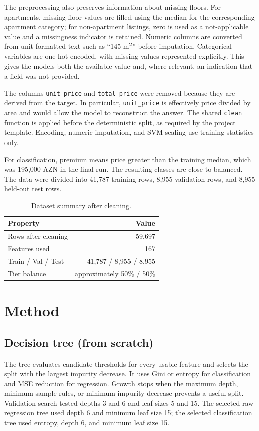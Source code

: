 \documentclass[10pt,twocolumn,a4paper]{article}
\begin{document}
The preprocessing also preserves information about missing floors. For
apartments, missing floor values are filled using the median for the
corresponding apartment category; for non-apartment listings, zero is used
as a not-applicable value and a missingness indicator is retained. Numeric
columns are converted from unit-formatted text such as ``145 m$^2$'' before
imputation. Categorical variables are one-hot encoded, with missing values
represented explicitly. This gives the models both the available value and,
where relevant, an indication that a field was not provided.

The columns \texttt{unit\_price} and \texttt{total\_price} were removed
because they are derived from the target. In particular,
\texttt{unit\_price} is effectively price divided by area and would allow
the model to reconstruct the answer. The shared \texttt{clean} function
is applied before the deterministic split, as required by the project
template. Encoding, numeric imputation, and SVM scaling use training
statistics only.

For classification, premium means price greater than the training median,
which was 195,000 AZN in the final run. The resulting classes are close
to balanced. The data were divided into 41,787 training rows, 8,955
validation rows, and 8,955 held-out test rows.

\begin{table}[t]
  \centering
  \caption{Dataset summary after cleaning.}
  \label{tab:data}
  \begin{tabular}{@{}lr@{}}
    \toprule
    Property & Value \\
    \midrule
    Rows after cleaning       & 59,697 \\
    Features used             & 167 \\
    Train / Val / Test        & 41,787 / 8,955 / 8,955 \\
    Tier balance              & approximately 50\% / 50\% \\
    \bottomrule
  \end{tabular}
\end{table}

\section{Method}
\subsection{Decision tree (from scratch)}
The tree evaluates candidate thresholds for every usable feature and
selects the split with the largest impurity decrease. It uses Gini or
entropy for classification and MSE reduction for regression. Growth stops
when the maximum depth, minimum sample rules, or minimum impurity decrease
prevents a useful split. Validation search tested depths 3 and 6 and leaf
sizes 5 and 15. The selected raw regression tree used depth 6 and minimum
leaf size 15; the selected classification tree used entropy, depth 6, and
minimum leaf size 15.
\end{document}
